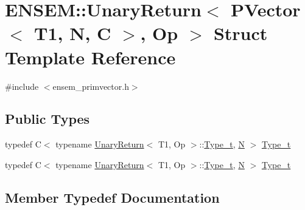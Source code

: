 \hypertarget{structENSEM_1_1UnaryReturn_3_01PVector_3_01T1_00_01N_00_01C_01_4_00_01Op_01_4}{}\section{E\+N\+S\+EM\+:\+:Unary\+Return$<$ P\+Vector$<$ T1, N, C $>$, Op $>$ Struct Template Reference}
\label{structENSEM_1_1UnaryReturn_3_01PVector_3_01T1_00_01N_00_01C_01_4_00_01Op_01_4}


{\ttfamily \#include $<$ensem\+\_\+primvector.\+h$>$}

\subsection*{Public Types}
\begin{DoxyCompactItemize}
\item 
typedef C$<$ typename \mbox{\hyperlink{structENSEM_1_1UnaryReturn}{Unary\+Return}}$<$ T1, Op $>$\+::\mbox{\hyperlink{structENSEM_1_1UnaryReturn_3_01PVector_3_01T1_00_01N_00_01C_01_4_00_01Op_01_4_a4c77aefad12cfcc1bdbcc457ce10d656}{Type\+\_\+t}}, \mbox{\hyperlink{operator__name__util_8cc_a7722c8ecbb62d99aee7ce68b1752f337}{N}} $>$ \mbox{\hyperlink{structENSEM_1_1UnaryReturn_3_01PVector_3_01T1_00_01N_00_01C_01_4_00_01Op_01_4_a4c77aefad12cfcc1bdbcc457ce10d656}{Type\+\_\+t}}
\item 
typedef C$<$ typename \mbox{\hyperlink{structENSEM_1_1UnaryReturn}{Unary\+Return}}$<$ T1, Op $>$\+::\mbox{\hyperlink{structENSEM_1_1UnaryReturn_3_01PVector_3_01T1_00_01N_00_01C_01_4_00_01Op_01_4_a4c77aefad12cfcc1bdbcc457ce10d656}{Type\+\_\+t}}, \mbox{\hyperlink{operator__name__util_8cc_a7722c8ecbb62d99aee7ce68b1752f337}{N}} $>$ \mbox{\hyperlink{structENSEM_1_1UnaryReturn_3_01PVector_3_01T1_00_01N_00_01C_01_4_00_01Op_01_4_a4c77aefad12cfcc1bdbcc457ce10d656}{Type\+\_\+t}}
\end{DoxyCompactItemize}


\subsection{Member Typedef Documentation}
\mbox{\label{structENSEM_1_1UnaryReturn_3_01PVector_3_01T1_00_01N_00_01C_01_4_00_01Op_01_4_a4c77aefad12cfcc1bdbcc457ce10d656}} 
